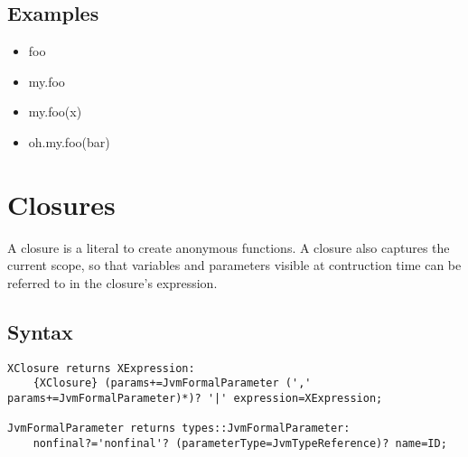 \documentclass[a4paper,10pt]{scrreprt}
\newlength{\itemindentlen}
\begin{document}
\subsection{Examples}


\setlength{\itemindentlen}{\textwidth}
\begin{itemize}
\addtolength{\itemindentlen}{-2em}

\item \begin{minipage}[t]{\itemindentlen}
foo
\end{minipage}

\item \begin{minipage}[t]{\itemindentlen}
my.foo
\end{minipage}

\item \begin{minipage}[t]{\itemindentlen}
my.foo(x)
\end{minipage}

\item \begin{minipage}[t]{\itemindentlen}
oh.my.foo(bar)
\end{minipage}

\end{itemize}
\addtolength{\itemindentlen}{2em}







\section{Closures}
\label{Closures}
A closure is a literal to create anonymous functions. A closure also captures the current scope, so that variables and parameters visible at contruction time can be referred to in the
closure's expression. 

\subsection{Syntax}

\begin{lstlisting}
XClosure returns XExpression:
	{XClosure} (params+=JvmFormalParameter (',' params+=JvmFormalParameter)*)? '|' expression=XExpression;
	
JvmFormalParameter returns types::JvmFormalParameter:
	nonfinal?='nonfinal'? (parameterType=JvmTypeReference)? name=ID;

\end{lstlisting}
\end{document}
